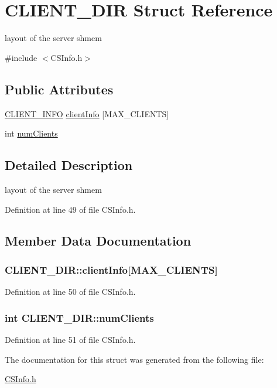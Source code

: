 \hypertarget{structCLIENT__DIR}{
\section{CLIENT\_\-DIR Struct Reference}
\label{structCLIENT__DIR}
}


layout of the server shmem  


{\ttfamily \#include $<$CSInfo.h$>$}\subsection*{Public Attributes}
\begin{DoxyCompactItemize}
\item 
\hyperlink{structCLIENT__INFO}{CLIENT\_\-INFO} \hyperlink{structCLIENT__DIR_a7d21df84272f01f020f4df3116bfd4cf}{clientInfo} \mbox{[}MAX\_\-CLIENTS\mbox{]}
\item 
int \hyperlink{structCLIENT__DIR_a2614205a6d6c4aa3127b3f393dbaaad3}{numClients}
\end{DoxyCompactItemize}


\subsection{Detailed Description}
layout of the server shmem 

Definition at line 49 of file CSInfo.h.

\subsection{Member Data Documentation}
\hypertarget{structCLIENT__DIR_a7d21df84272f01f020f4df3116bfd4cf}{
\subsubsection[{clientInfo}]{ {\bf CLIENT\_\-DIR::clientInfo}\mbox{[}MAX\_\-CLIENTS\mbox{]}}}
\label{structCLIENT__DIR_a7d21df84272f01f020f4df3116bfd4cf}


Definition at line 50 of file CSInfo.h.\hypertarget{structCLIENT__DIR_a2614205a6d6c4aa3127b3f393dbaaad3}{
\subsubsection[{numClients}]{\setlength{\rightskip}{0pt plus 5cm}int {\bf CLIENT\_\-DIR::numClients}}}
\label{structCLIENT__DIR_a2614205a6d6c4aa3127b3f393dbaaad3}


Definition at line 51 of file CSInfo.h.

The documentation for this struct was generated from the following file:\begin{DoxyCompactItemize}
\item 
\hyperlink{CSInfo_8h}{CSInfo.h}\end{DoxyCompactItemize}

